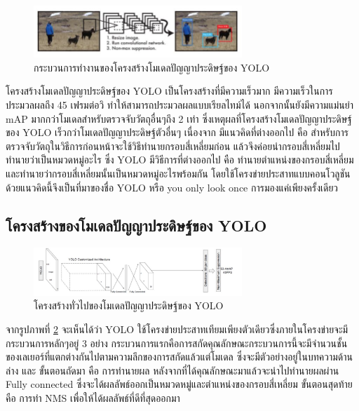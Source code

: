 \begin{figure}[!ht]
    \centering
    \includegraphics[width=0.7\textwidth]{chapter2/images/yolo.jpg}
    \caption{กระบวนการทำงานของโครงสร้างโมเดลปัญญาประดิษฐ์ของ YOLO}
    \label{fig:yolo}
\end{figure}

โครงสร้างโมเดลปัญญาประดิษฐ์ของ YOLO เป็นโครงสร้างที่มีความเร็วมาก มีความเร็วในการประมวลผลถึง 45 เฟรมต่อวิ ทำให้สามารถประมวลผลแบบเรียลไทม์ได้ นอกจากนั้นยังมีความแม่นยำ mAP มากกว่าโมเดลสำหรับตรวจจับวัตถุอื่นๆถึง 2 เท่า ซึ่งเหตุผลที่โครงสร้างโมเดลปัญญาประดิษฐ์ของ YOLO เร็วกว่าโมเดลปัญญาประดิษฐ์ตัวอื่นๆ เนื่องจาก มีแนวคิดที่ต่างออกไป คือ สำหรับการตรวจจับวัตถุในวิธีการก่อนหน้าจะใช้วิธีทำนายกรอบสี่เหลี่ยมก่อน แล้วจึงค่อยนำกรอบสี่เหลี่ยมไปทำนายว่าเป็นหมวดหมู่อะไร ซึ่ง YOLO มีวิธีการที่ต่างออกไป คือ ทำนายตำแหน่งของกรอบสี่เหลี่ยมและทำนายว่ากรอบสี่เหลี่ยมนั้นเป็นหมวดหมู่อะไรพร้อมกัน โดยใช้โครงข่ายประสาทแบบคอนโวลูชัน ด้วยแนวคิดนี้จึงเป็นที่มาของชื่อ YOLO หรือ you only look once การมองแค่เพียงครั้งเดียว 
\subsection*{โครงสร้างของโมเดลปัญญาประดิษฐ์ของ YOLO} 
\begin{figure}[!ht]
    \centering
    \includegraphics[width=0.7\textwidth]{chapter2/images/yolo_architecture.jpg}
    \caption{โครงสร้างทั่วไปของโมเดลปัญญาประดิษฐ์ของ YOLO}
    \label{fig:yolo_architecture}
\end{figure}

จากรูปภาพที่ \ref{fig:yolo_architecture} จะเห็นได้ว่า YOLO ใช้โครงข่ายประสาทเทียมเพียงตัวเดียวซึ่งภายในโครงข่ายจะมีกระบวนการหลักๆอยู่ 3 อย่าง กระบวนการแรกคือการสกัดคุณลักษณะกระบวนการนี้จะมีจำนวนชั้นของเลเยอร์ที่แตกต่างกันไปตามความลึกของการสกัดแล้วแต่โมเดล ซึ่งจะมีตัวอย่างอยู่ในบทความด้านล่าง และ ขั้นตอนถัดมา คือ การทำนายผล หลังจากที่ได้คุณลักษณะมาแล้วจะนำไปทำนายผลผ่าน Fully connected ซึ่งจะได้ผลลัพธ์ออกเป็นหมวดหมู่และตำแหน่งของกรอบสี่เหลี่ยม ขั้นตอนสุดท้ายคือ การทำ NMS เพื่อให้ได้ผลลัพธ์ที่ดีที่สุดออกมา




